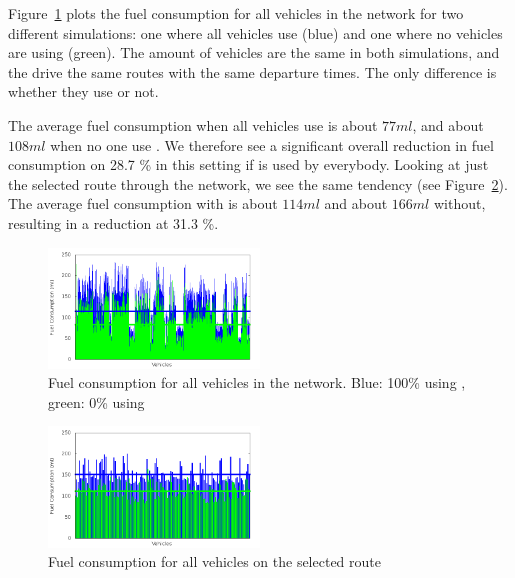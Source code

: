 Figure~\ref{fig:TestResults:fuelTotal} plots the fuel consumption for all vehicles in the network for two different simulations: one where all vehicles use \tech (blue) and one where no vehicles are using \tech (green).
The amount of vehicles are the same in both simulations, and the drive the same routes with the same departure times. 
The only difference is whether they use \tech or not.

The average fuel consumption when all vehicles use \tech is about $77 ml$, and about $108 ml$ when no one use \tech.
We therefore see a significant overall reduction in fuel consumption on 28.7 \% in this setting if \tech is used by everybody.
Looking at just the selected route through the network, we see the same tendency (see Figure~\ref{fig:TestResults:fuelRoute}). 
The average fuel consumption with \tech is about $114 ml$ and about $166 ml$ without, resulting in a reduction at 31.3 \%.
\begin{figure}[h]
\includegraphics[width=0.5\textwidth]{../images/tp0/fuelTotal.png}
\caption{Fuel consumption for all vehicles in the network. Blue: 100\% using \tech, green: 0\% using \tech}
\label{fig:TestResults:fuelTotal}
\end{figure}
\begin{figure}[h]
\includegraphics[width=0.5\textwidth]{../images/tp0/fuelRoute.png}
\caption{Fuel consumption for all vehicles on the selected route}
\label{fig:TestResults:fuelRoute}
\end{figure}

